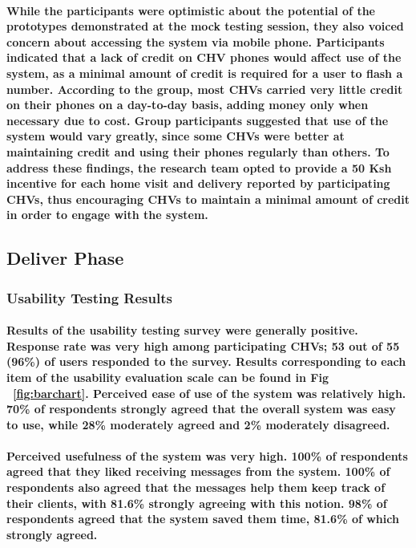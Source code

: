 \paragraph{While the participants were optimistic about the potential of the prototypes demonstrated at the mock testing session, they also voiced concern about accessing the system via mobile phone. Participants indicated that a lack of credit on CHV phones would affect use of the system, as a minimal amount of credit is required for a user to flash a number. According to the group, most CHVs carried very little credit on their phones on a day-to-day basis, adding money only when necessary due to cost. Group participants suggested that use of the system would vary greatly, since some CHVs were better at maintaining credit and using their phones regularly than others. To address these findings, the research team opted to provide a 50 Ksh incentive for each home visit and delivery reported by participating CHVs, thus encouraging CHVs to maintain a minimal amount of credit in order to engage with the system.}


\subsection{Deliver Phase}
\subsubsection{Usability Testing Results}
\paragraph{Results of the usability testing survey were generally positive. Response rate was very high among participating CHVs; 53 out of 55 (96\%) of users responded to the survey. Results corresponding to each item of the usability evaluation scale can be found in Fig ~\ref{fig:barchart}. Perceived ease of use of the system was relatively high. 70\% of respondents strongly agreed that the overall system was easy to use, while 28\% moderately agreed and 2\%  moderately disagreed. }

\paragraph{Perceived usefulness of the system was very high. 100\% of respondents agreed that they liked receiving messages from the system. 100\% of respondents also agreed that the messages help them keep track of their clients, with 81.6\% strongly agreeing with this notion. 98\% of respondents agreed that the system saved them time, 81.6\% of which strongly agreed.}

